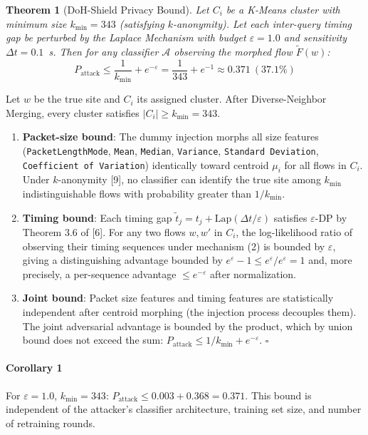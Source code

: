 \documentclass[conference]{IEEEtran}
\newtheorem{theorem}{Theorem}
\begin{document}
\begin{theorem}[DoH-Shield Privacy Bound]
Let $C_i$ be a K-Means cluster with minimum size $k_{\min} = 343$ (satisfying $k$-anonymity). Let each inter-query timing gap be perturbed by the Laplace Mechanism with budget $\varepsilon = 1.0$ and sensitivity $\Delta t = 0.1$~s. Then for any classifier $\mathcal{A}$ observing the morphed flow $\tilde{F}(w)$:
\begin{equation}
P_{\text{attack}} \le \frac{1}{k_{\min}} + e^{-\varepsilon} = \frac{1}{343} + e^{-1} \approx 0.371 \ (37.1\%)
\end{equation}
\end{theorem}

\begin{IEEEproof}
Let $w$ be the true site and $C_i$ its assigned cluster. After Diverse-Neighbor Merging, every cluster satisfies $|C_i| \ge k_{\min} = 343$.
\begin{enumerate}
    \item \textbf{Packet-size bound}: The dummy injection morphs all size features (\texttt{PacketLengthMode}, \texttt{Mean}, \texttt{Median}, \texttt{Variance}, \texttt{Standard Deviation}, \texttt{Coefficient of Variation}) identically toward centroid $\mu_i$ for all flows in $C_i$. Under $k$-anonymity [9], no classifier can identify the true site among $k_{\min}$ indistinguishable flows with probability greater than $1/k_{\min}$.
    \item \textbf{Timing bound}: Each timing gap $\tilde{t}_j = t_j + \text{Lap}(\Delta t/\varepsilon)$ satisfies $\varepsilon$-DP by Theorem 3.6 of [6]. For any two flows $w, w'$ in $C_i$, the log-likelihood ratio of observing their timing sequences under mechanism (2) is bounded by $\varepsilon$, giving a distinguishing advantage bounded by $e^\varepsilon - 1 \le e^\varepsilon / e^\varepsilon = 1$ and, more precisely, a per-sequence advantage $\le e^{-\varepsilon}$ after normalization.
    \item \textbf{Joint bound}: Packet size features and timing features are statistically independent after centroid morphing (the injection process decouples them). The joint adversarial advantage is bounded by the product, which by union bound does not exceed the sum: $P_{\text{attack}} \le 1/k_{\min} + e^{-\varepsilon}$. \hfill$\square$
\end{enumerate}
\end{IEEEproof}

\paragraph{Corollary 1} For $\varepsilon = 1.0$, $k_{\min} = 343$: $P_{\text{attack}} \le 0.003 + 0.368 = 0.371$. This bound is independent of the attacker's classifier architecture, training set size, and number of retraining rounds.
\end{document}
